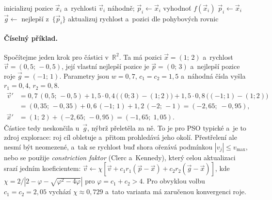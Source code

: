 \documentclass[11pt,a4paper]{article}
\theoremstyle{definition}
\begin{document}
\begin{algorithm}[!ht]
\caption{PSO}
\begin{algorithmic}[1]
\State inicializuj pozice $\vec x_i$ a~rychlosti $\vec v_i$ náhodně; $\vec p_i \gets \vec x_i$
\Repeat
    \State vyhodnoť $f(\vec x_i)$
     $\vec p_i \gets \vec x_i$ \EndIf
  \EndFor
  \State $\vec g \gets$ nejlepší z~$\{\vec p_i\}$
    \State aktualizuj rychlost a~pozici dle pohybových rovnic
  \EndFor
{}
\end{algorithmic}
\end{algorithm}

\paragraph{Číselný příklad.} Spočítejme jeden krok pro částici v~$\mathbb{R}^2$. Ta má pozici
$\vec x = (1;\,2)$ a~rychlost $\vec v = (0{,}5;\,-0{,}5)$, její vlastní nejlepší pozice je
$\vec p = (0;\,3)$ a~nejlepší pozice roje $\vec g = (-1;\,1)$. Parametry jsou $w = 0{,}7$,
$c_1 = c_2 = 1{,}5$ a~náhodná čísla vyšla $r_1 = 0{,}4$, $r_2 = 0{,}8$.
\begin{align*}
\vec v' &= 0{,}7\,(0{,}5;\,-0{,}5) + 1{,}5\cdot 0{,}4\,\big((0;3)-(1;2)\big)
  + 1{,}5\cdot 0{,}8\,\big((-1;1)-(1;2)\big)\\
 &= (0{,}35;\,-0{,}35) + 0{,}6\,(-1;\,1) + 1{,}2\,(-2;\,-1)
  = (-2{,}65;\; -0{,}95),\\
\vec x' &= (1;\,2) + (-2{,}65;\,-0{,}95) = (-1{,}65;\; 1{,}05).
\end{align*}
Částice tedy neskončila u~$\vec g$, nýbrž přeletěla za ně. To je pro PSO typické a~je to
zdroj explorace: roj cíl obletuje a~přitom prohledává jeho okolí. Přestřelení ale nesmí být
neomezené, a~tak se rychlost buď shora ořezává podmínkou $|v_j| \le v_{\max}$, nebo se použije
\emph{constriction faktor} (Clerc a~Kennedy), který celou aktualizaci srazí jedním
koeficientem:
$\vec v \gets \chi[\vec v + c_1 r_1(\vec p - \vec x) + c_2 r_2 (\vec g - \vec x)]$,
kde $\chi = 2/|2 - \varphi - \sqrt{\varphi^2 - 4\varphi}|$ pro
$\varphi = c_1 + c_2 > 4$. Pro obvyklou volbu $c_1=c_2=2{,}05$ vychází $\chi \approx 0{,}729$
a~tato varianta má zaručenou konvergenci roje.
\end{document}
